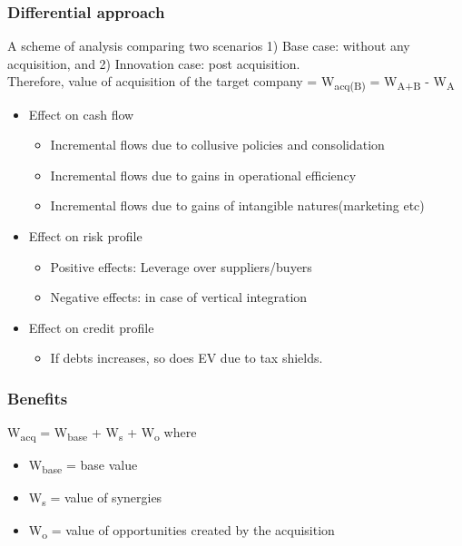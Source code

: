 \documentclass[11pt]{article}
\begin{document}
\subsubsection*{Differential approach}
\label{sec:org4fe81d5}
 A scheme of analysis comparing two scenarios 1) Base case: without any acquisition, and 2) Innovation case: post acquisition.\\
Therefore, value of acquisition of the target company = W\textsubscript{acq(B)} = W\textsubscript{A+B} - W\textsubscript{A}\\
\begin{itemize}
\item Effect on cash flow
\label{sec:org28ab19d}
\begin{itemize}
\item Incremental flows due to collusive policies and consolidation\\
\item Incremental flows due to gains in operational efficiency\\
\item Incremental flows due to gains of intangible natures(marketing etc)\\
\end{itemize}
\item Effect on risk profile
\label{sec:org248a5a4}
\begin{itemize}
\item Positive effects: Leverage over suppliers/buyers\\
\item Negative effects: in case of vertical integration\\
\end{itemize}
\item Effect on credit profile
\label{sec:org1dd0766}
\begin{itemize}
\item If debts increases, so does EV due to tax shields.\\
\end{itemize}
\end{itemize}
\subsubsection*{Benefits}
\label{sec:org69c5b6f}
W\textsubscript{acq} = W\textsubscript{base} + W\textsubscript{s} + W\textsubscript{o} where\\
\begin{itemize}
\item W\textsubscript{base} = base value\\
\item W\textsubscript{s} = value of synergies\\
\item W\textsubscript{o} = value of opportunities created by the acquisition\\
\end{itemize}
\end{document}

